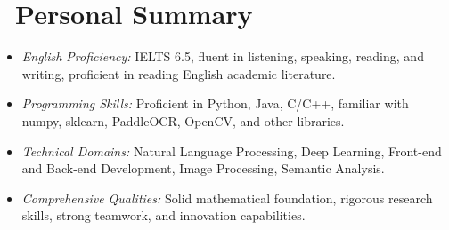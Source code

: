 \documentclass{../../styles/resume}
\begin{document}
\section{\faInfo\ Personal Summary}
\begin{itemize}
  \item \textit{English Proficiency:} IELTS 6.5, fluent in listening, speaking, reading, and writing, proficient in reading English academic literature.
  \item \textit{Programming Skills:} Proficient in Python, Java, C/C++, familiar with numpy, sklearn, PaddleOCR, OpenCV, and other libraries.
  \item \textit{Technical Domains:} Natural Language Processing, Deep Learning, Front-end and Back-end Development, Image Processing, Semantic Analysis.
  \item \textit{Comprehensive Qualities:} Solid mathematical foundation, rigorous research skills, strong teamwork, and innovation capabilities.
\end{itemize}
\end{document}
